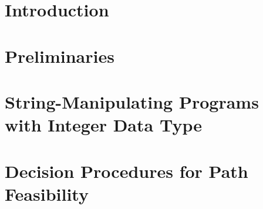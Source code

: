 \documentclass{llncs}
\begin{document}
%
%

\section{Introduction}

%
%
%
%
%
%
%




\section{Preliminaries}\label{sec:prel}




\section{String-Manipulating Programs with Integer Data Type}\label{sec:logic}





%


\section{Decision Procedures for Path Feasibility}\label{sec:dec}


\end{document}
